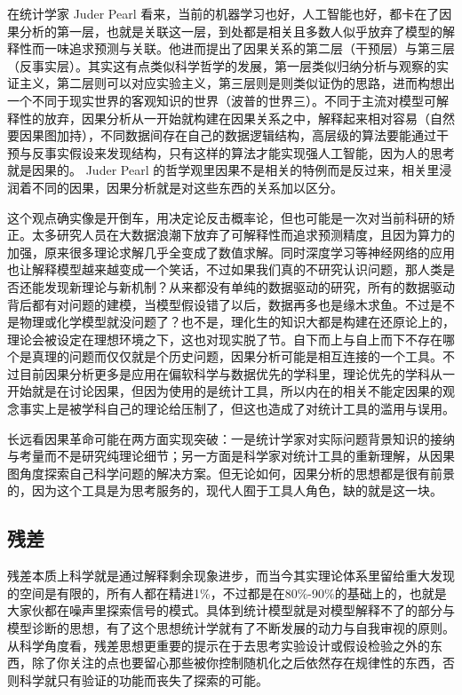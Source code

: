 \documentclass[]{tufte-book}
\begin{document}
在统计学家 Juder Pearl 看来，当前的机器学习也好，人工智能也好，都卡在了因果分析的第一层，也就是关联这一层，到处都是相关且多数人似乎放弃了模型的解释性而一味追求预测与关联。他进而提出了因果关系的第二层（干预层）与第三层（反事实层）。其实这有点类似科学哲学的发展，第一层类似归纳分析与观察的实证主义，第二层则可以对应实验主义，第三层则是则类似证伪的思路，进而构想出一个不同于现实世界的客观知识的世界（波普的世界三）。不同于主流对模型可解释性的放弃，因果分析从一开始就构建在因果关系之中，解释起来相对容易（自然要因果图加持），不同数据间存在自己的数据逻辑结构，高层级的算法要能通过干预与反事实假设来发现结构，只有这样的算法才能实现强人工智能，因为人的思考就是因果的。 Juder Pearl 的哲学观里因果不是相关的特例而是反过来，相关里浸润着不同的因果，因果分析就是对这些东西的关系加以区分。

这个观点确实像是开倒车，用决定论反击概率论，但也可能是一次对当前科研的矫正。太多研究人员在大数据浪潮下放弃了可解释性而追求预测精度，且因为算力的加强，原来很多理论求解几乎全变成了数值求解。同时深度学习等神经网络的应用也让解释模型越来越变成一个笑话，不过如果我们真的不研究认识问题，那人类是否还能发现新理论与新机制？从来都没有单纯的数据驱动的研究，所有的数据驱动背后都有对问题的建模，当模型假设错了以后，数据再多也是缘木求鱼。不过是不是物理或化学模型就没问题了？也不是，理化生的知识大都是构建在还原论上的，理论会被设定在理想环境之下，这也对现实脱了节。自下而上与自上而下不存在哪个是真理的问题而仅仅就是个历史问题，因果分析可能是相互连接的一个工具。不过目前因果分析更多是应用在偏软科学与数据优先的学科里，理论优先的学科从一开始就是在讨论因果，但因为使用的是统计工具，所以内在的相关不能定因果的观念事实上是被学科自己的理论给压制了，但这也造成了对统计工具的滥用与误用。

长远看因果革命可能在两方面实现突破：一是统计学家对实际问题背景知识的接纳与考量而不是研究纯理论细节；另一方面是科学家对统计工具的重新理解，从因果图角度探索自己科学问题的解决方案。但无论如何，因果分析的思想都是很有前景的，因为这个工具是为思考服务的，现代人囿于工具人角色，缺的就是这一块。

\hypertarget{ux6b8bux5dee}{%
\subsection{残差}\label{ux6b8bux5dee}}

残差本质上科学就是通过解释剩余现象进步，而当今其实理论体系里留给重大发现的空间是有限的，所有人都在精进1\%，不过都是在80\%-90\%的基础上的，也就是大家伙都在噪声里探索信号的模式。具体到统计模型就是对模型解释不了的部分与模型诊断的思想，有了这个思想统计学就有了不断发展的动力与自我审视的原则。从科学角度看，残差思想更重要的提示在于去思考实验设计或假设检验之外的东西，除了你关注的点也要留心那些被你控制随机化之后依然存在规律性的东西，否则科学就只有验证的功能而丧失了探索的可能。
\end{document}
